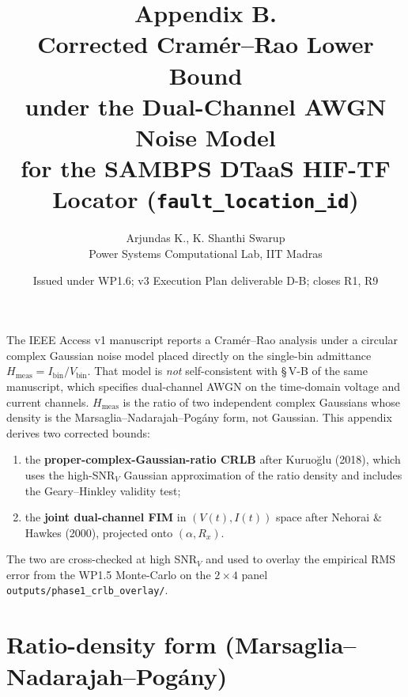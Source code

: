 \documentclass[11pt,a4paper]{article}
\title{Appendix B.\\[2pt]
       Corrected Cram\'er--Rao Lower Bound\\
       under the Dual-Channel AWGN Noise Model\\[6pt]
       \large for the SAMBPS DTaaS HIF-TF Locator (\texttt{fault\_location\_id})}
\author{Arjundas K., K. Shanthi Swarup\\[1pt]
        \small Power Systems Computational Lab, IIT Madras}
\date{Issued under WP1.6; v3 Execution Plan deliverable D-B; closes R1, R9}
\begin{document}
\maketitle

\noindent
The IEEE Access v1 manuscript reports a Cram\'er--Rao analysis under
a circular complex Gaussian noise model placed directly on the
single-bin admittance $H_{\mathrm{meas}} = I_{\mathrm{bin}}/V_{\mathrm{bin}}$.
That model is \emph{not} self-consistent with \S\,V-B of the same
manuscript, which specifies dual-channel AWGN on the time-domain
voltage and current channels.  $H_{\mathrm{meas}}$ is the ratio of
two independent complex Gaussians whose density is the
Marsaglia--Nadarajah--Pog\'any form, not Gaussian.  This appendix
derives two corrected bounds:

\begin{enumerate}
  \item the \textbf{proper-complex-Gaussian-ratio CRLB} after
        Kuruo\u{g}lu (2018), which uses the high-SNR$_V$ Gaussian
        approximation of the ratio density and includes the
        Geary--Hinkley validity test;
  \item the \textbf{joint dual-channel FIM} in $(V(t), I(t))$ space
        after Nehorai \& Hawkes (2000), projected onto $(\alpha, R_x)$.
\end{enumerate}

The two are cross-checked at high SNR$_V$ and used to overlay the
empirical RMS error from the WP1.5 Monte-Carlo on the
$2\times 4$ panel \texttt{outputs/phase1\_crlb\_overlay/}.

\section{Ratio-density form (Marsaglia--Nadarajah--Pog\'any)}
\end{document}
